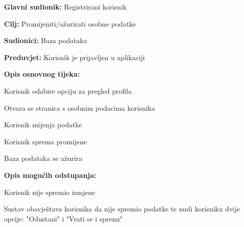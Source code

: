 				\noindent {}
					\begin{packed_item}
	
						\item \textbf{Glavni sudionik: }Registrirani korisnik
						\item  \textbf{Cilj:} Promijeniti/ažurirati osobne podatke
						\item  \textbf{Sudionici:} Baza podataka
						\item  \textbf{Preduvjet:} Korisnik je prijavljen u aplikaciji
						\item  \textbf{Opis osnovnog tijeka:}
						
						\item[] \begin{packed_enum}
	
							\item Korisnik odabire opciju za pregled profila
							\item Otvara se stranica s osobnim podacima korisnika
							\item Korisnik mijenja podatke
							\item Korisnik sprema promijene
							\item Baza podataka se ažurira

						\end{packed_enum}
						
						\item  \textbf{Opis mogućih odstupanja:}
						
						\item[] \begin{packed_item}
	
							\item[4.a] Korisnik nije spremio izmjene
								\begin{packed_item}
									\item Sustav obavještava korisnika da nije spremio podatke te nudi korisniku dvije opcije: "Odustani" i "Vrati se i spremi"
								\end{packed_item}
							
						\end{packed_item}						
					\end{packed_item}
					
